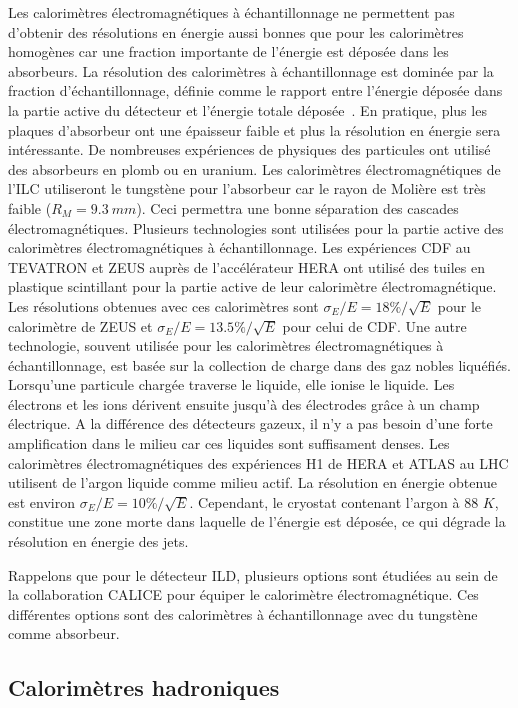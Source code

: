 Les calorimètres électromagnétiques à échantillonnage ne permettent pas d'obtenir des résolutions en énergie aussi bonnes que pour les calorimètres homogènes car une fraction importante de l'énergie est déposée dans les absorbeurs. La résolution des calorimètres à échantillonnage est dominée par la fraction d’échantillonnage, définie comme le rapport entre l'énergie déposée dans la partie active du détecteur et l'énergie totale déposée~\cite{wigmans}. En pratique, plus les plaques d'absorbeur ont une épaisseur faible et plus la résolution en énergie sera intéressante. De nombreuses expériences de physiques des particules ont utilisé des absorbeurs en plomb ou en uranium. Les calorimètres électromagnétiques de l'ILC utiliseront le tungstène pour l'absorbeur car le rayon de Molière est très faible ($R_M=9.3~mm$). Ceci permettra une bonne séparation des cascades électromagnétiques. Plusieurs technologies sont utilisées pour la partie active des calorimètres électromagnétiques à échantillonnage. Les expériences CDF au TEVATRON \cite{cdf_ecal} et ZEUS auprès de l'accélérateur HERA \cite{zeus_ecal} ont utilisé des tuiles en plastique scintillant pour la partie active de leur calorimètre électromagnétique. Les résolutions obtenues avec ces calorimètres sont $\sigma_E/E=18\%/\sqrt{E}$ pour le calorimètre de ZEUS et $\sigma_E/E=13.5\%/\sqrt{E}$ pour celui de CDF. Une autre technologie, souvent utilisée pour les calorimètres électromagnétiques à échantillonnage, est basée sur la collection de charge dans des gaz nobles liquéfiés. Lorsqu'une particule chargée traverse le liquide, elle ionise le liquide. Les électrons et les ions dérivent ensuite jusqu'à des électrodes grâce à un champ électrique. A la différence des détecteurs gazeux, il n'y a pas besoin d'une forte amplification dans le milieu car ces liquides sont suffisament denses. Les calorimètres électromagnétiques des expériences H1 de HERA \cite{h1-ecal} et ATLAS au LHC \cite{atlas-liquid-ar} utilisent de l'argon liquide comme milieu actif. La résolution en énergie obtenue est environ $\sigma_E/E=10\%/\sqrt{E}$. Cependant, le cryostat contenant l'argon à 88 $K$, constitue une zone morte dans laquelle de l'énergie est déposée, ce qui dégrade la résolution en énergie des jets.

Rappelons que pour le détecteur ILD, plusieurs options sont étudiées au sein de la collaboration CALICE pour équiper le calorimètre électromagnétique. Ces différentes options sont des calorimètres à échantillonnage avec du tungstène comme absorbeur. 
\subsection{Calorimètres hadroniques}

